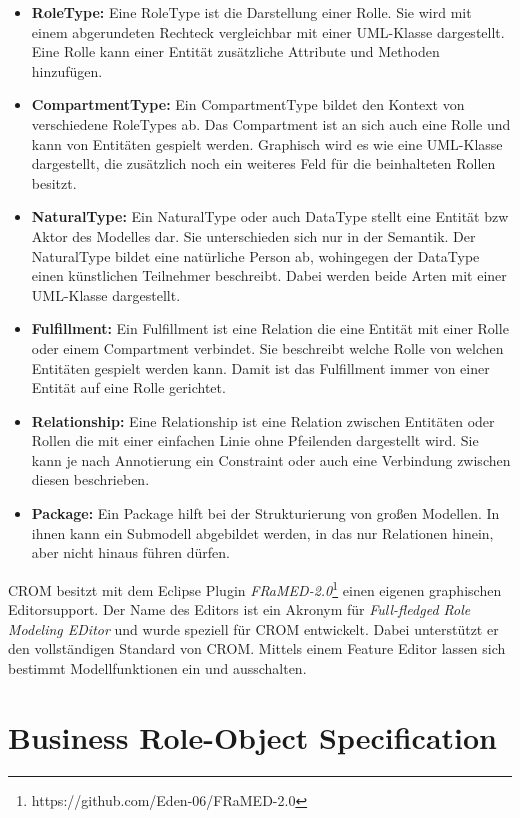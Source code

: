 \begin{itemize}
    \item \textbf{RoleType:}
    Eine RoleType ist die Darstellung einer Rolle.
    Sie wird mit einem abgerundeten Rechteck vergleichbar mit einer UML-Klasse dargestellt.
    Eine Rolle kann einer Entität zusätzliche Attribute und Methoden hinzufügen.
    \item \textbf{CompartmentType:}
    Ein CompartmentType bildet den Kontext von verschiedene RoleTypes ab.
    Das Compartment ist an sich auch eine Rolle und kann von Entitäten gespielt werden.
    Graphisch wird es wie eine UML-Klasse dargestellt, die zusätzlich noch ein weiteres Feld für die beinhalteten Rollen besitzt.
    \item \textbf{NaturalType:}
    Ein NaturalType oder auch DataType stellt eine Entität bzw Aktor des Modelles dar.
    Sie unterschieden sich nur in der Semantik.
    Der NaturalType bildet eine natürliche Person ab, wohingegen der DataType einen künstlichen Teilnehmer beschreibt.
    Dabei werden beide Arten mit einer UML-Klasse dargestellt. 
    \item \textbf{Fulfillment:}
    Ein Fulfillment ist eine Relation die eine Entität mit einer Rolle oder einem Compartment verbindet.
    Sie beschreibt welche Rolle von welchen Entitäten gespielt werden kann.
    Damit ist das Fulfillment immer von einer Entität auf eine Rolle gerichtet.
    \item \textbf{Relationship:}
    Eine Relationship ist eine Relation zwischen Entitäten oder Rollen die mit einer einfachen Linie ohne Pfeilenden dargestellt wird.
    Sie kann je nach Annotierung ein Constraint oder auch eine Verbindung zwischen diesen beschrieben.
    \item \textbf{Package:}
    Ein Package hilft bei der Strukturierung von großen Modellen.
    In ihnen kann ein Submodell abgebildet werden, in das nur Relationen hinein, aber nicht hinaus führen dürfen.
\end{itemize}

CROM besitzt mit dem Eclipse Plugin \emph{FRaMED-2.0}\footnote{https://github.com/Eden-06/FRaMED-2.0} einen eigenen graphischen Editorsupport.
Der Name des Editors ist ein Akronym für \emph{Full-fledged Role Modeling EDitor} und wurde speziell für CROM entwickelt.
Dabei unterstützt er den vollständigen Standard von CROM.
Mittels einem Feature Editor lassen sich bestimmt Modellfunktionen ein und ausschalten.

\section{Business Role-Object Specification}

